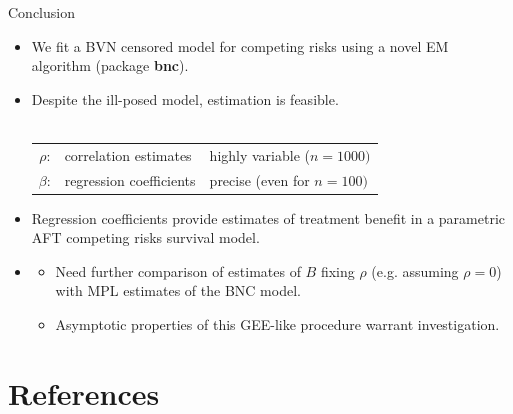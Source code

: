 \documentclass[10pt]{beamer}
\begin{document}
\begin{frame}{Conclusion}
  \begin{itemize}
  \item
    We fit a \alert{BVN censored model} for competing risks using a novel EM algorithm 
    (package \textbf{bnc}).
  \item
    Despite the \alert{ill-posed} model, estimation is feasible.\\
    {\color{DarkBlue}{Estimates:}} \\
   
    \begin{tabular}{ c l l }
    \hline
    $\rho$: &  \alert{correlation estimates} & highly variable ($n=1000)$ \\
    $\beta$: & \alert{regression coefficients}  &  precise (even for $n=100)$ \\ \hline  
    \end{tabular}
    
  \item Regression coefficients provide estimates of \alert{treatment benefit} 
  in a parametric \alert{AFT competing risks} survival model.
  \end{itemize}
  
  \begin{itemize}
  \item
    {\color{DarkBlue}{Outlook}}
    \begin{itemize}
    \item
      Need further comparison of estimates of $B$ fixing $\rho$ (e.g. assuming $\rho=0$) with MPL estimates of the BNC model.
    \item
      Asymptotic properties of this GEE-like procedure warrant investigation.
    \end{itemize}
  \end{itemize}
\end{frame}







\section*{References}\label{references}
\end{document}
